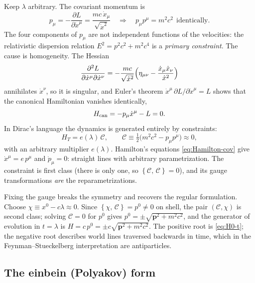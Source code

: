 \documentclass[11pt,a4paper]{book}
\numberwithin{equation}{section}
\newcommand{\pdv}[2]{\dfrac{\partial #1}{\partial #2}}
\newcommand{\PB}[2]{\left\{#1,\,#2\right\}}
\newcommand{\Cc}{\mathcal{C}}          %
\newcommand{\bp}{\mathbf{p}}
\theoremstyle{definition}
\theoremstyle{remark}
\begin{document}
Keep $\lambda$ arbitrary.  The covariant momentum is
\begin{equation}
  p_\mu=-\pdv{L}{\dot x^\mu}=\frac{mc\,\dot x_\mu}{\sqrt{\dot x^2}}
  \quad\Longrightarrow\quad
  p_\mu p^\mu=m^2c^2 \ \ \text{identically}.
  \label{eq:massshell-free}
\end{equation}
The four components of $p_\mu$ are not independent functions of the
velocities: the relativistic dispersion relation $E^2=p^2c^2+m^2c^4$ is a
\emph{primary constraint}.  The cause is homogeneity.  The Hessian
\begin{equation}
  \pdv{^2L}{\dot x^\mu\partial\dot x^\nu}
  =-\frac{mc}{\sqrt{\dot x^2}}\Bigl(\eta_{\mu\nu}-\frac{\dot x_\mu\dot x_\nu}{\dot x^2}\Bigr)
\end{equation}
annihilates $\dot x^\nu$, so it is singular, and Euler's theorem
$\dot x^\mu\,\partial L/\partial\dot x^\mu=L$ shows that the canonical
Hamiltonian vanishes identically,
\begin{equation}
  H_{\rm can}=-p_\mu\dot x^\mu-L=0 .
\end{equation}
In Dirac's language the dynamics is generated entirely by constraints:
\begin{equation}
  H_T=e(\lambda)\,\Cc,\qquad
  \Cc\equiv\tfrac12\bigl(m^2c^2-p_\mu p^\mu\bigr)\approx0,
  \label{eq:HT-free}
\end{equation}
with an arbitrary multiplier $e(\lambda)$.  Hamilton's equations
\eqref{eq:Hamilton-cov} give $\dot x^\mu=e\,p^\mu$ and $\dot p_\mu=0$:
straight lines with arbitrary parametrization.  The constraint is
first class (there is only one, so $\PB{\Cc}{\Cc}=0$), and its gauge
transformations \emph{are} the reparametrizations.

Fixing the gauge breaks the symmetry and recovers the regular formulation.
Choose $\chi\equiv x^0-c\lambda\approx0$.  Since
$\PB{\chi}{\Cc}=p^0\neq0$ on shell, the pair $(\Cc,\chi)$ is second class;
solving $\Cc=0$ for $p^0$ gives $p^0=\pm\sqrt{\bp^2+m^2c^2}$, and the
generator of evolution in $t=\lambda$ is $H=c\,p^0=\pm c\sqrt{\bp^2+m^2c^2}$.
The positive root is \eqref{eq:H0-t}; the negative root describes world
lines traversed backwards in time, which in the Feynman--Stueckelberg
interpretation are antiparticles.

\subsection{The einbein (Polyakov) form}
\end{document}

